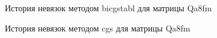 \begin{figure}[H]
    \renewcommand{\figurename}{Рисунок}
    \caption{История невязок методом bicgstabl для матрицы Qa8fm}
    \label{fig:image_14}
\end{figure}

\begin{figure}[H]
    \renewcommand{\figurename}{Рисунок}
    \caption{История невязок методом cgs для матрицы Qa8fm}
    \label{fig:image_15}
\end{figure}

